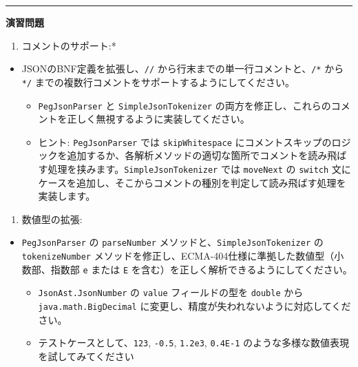 \begin{center}\rule{0.5\linewidth}{0.5pt}\end{center}

\textbf{演習問題}

\begin{enumerate}
\def\labelenumi{\arabic{enumi}.}
\tightlist
\item
  コメントのサポート:*
\end{enumerate}

\begin{itemize}
\tightlist
\item
  JSONのBNF定義を拡張し、\texttt{//}
  から行末までの単一行コメントと、\texttt{/*} から \texttt{*/}
  までの複数行コメントをサポートするようにしてください。

  \begin{itemize}
  \tightlist
  \item
    \texttt{PegJsonParser} と \texttt{SimpleJsonTokenizer}
    の両方を修正し、これらのコメントを正しく無視するように実装してください。
  \item
    ヒント: \texttt{PegJsonParser} では \texttt{skipWhitespace}
    にコメントスキップのロジックを追加するか、各解析メソッドの適切な箇所でコメントを読み飛ばす処理を挟みます。\texttt{SimpleJsonTokenizer}
    では \texttt{moveNext} の \texttt{switch}
    文にケースを追加し、そこからコメントの種別を判定して読み飛ばす処理を実装します。
  \end{itemize}
\end{itemize}

\begin{enumerate}
\def\labelenumi{\arabic{enumi}.}
\setcounter{enumi}{1}
\tightlist
\item
  数値型の拡張:
\end{enumerate}

\begin{itemize}
\tightlist
\item
  \texttt{PegJsonParser} の \texttt{parseNumber}
  メソッドと、\texttt{SimpleJsonTokenizer} の \texttt{tokenizeNumber}
  メソッドを修正し、ECMA-404仕様に準拠した数値型（小数部、指数部
  \texttt{e} または \texttt{E}
  を含む）を正しく解析できるようにしてください。

  \begin{itemize}
  \tightlist
  \item
    \texttt{JsonAst.JsonNumber} の \texttt{value} フィールドの型を
    \texttt{double} から \texttt{java.math.BigDecimal}
    に変更し、精度が失われないように対応してください。
  \item
    テストケースとして、\texttt{123}, \texttt{-0.5}, \texttt{1.2e3},
    \texttt{0.4E-1} のような多様な数値表現を試してみてください
  \end{itemize}
\end{itemize}
